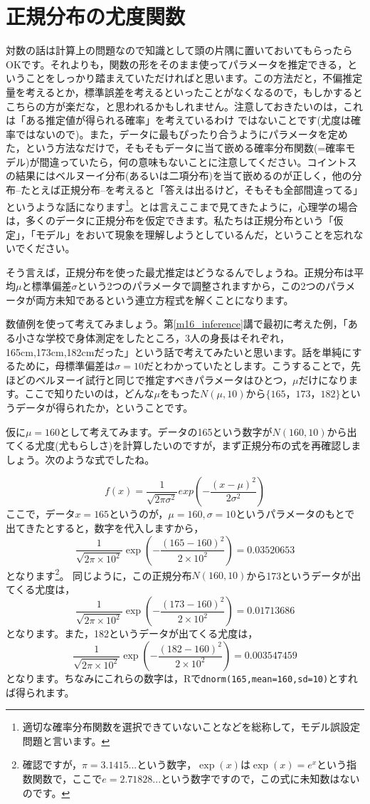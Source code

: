 \documentclass{ltjsbook}
\begin{document}
\section{正規分布の尤度関数}
対数の話は計算上の問題なので知識として頭の片隅に置いておいてもらったらOKです。それよりも，関数の形をそのまま使ってパラメータを推定できる，ということをしっかり踏まえていただければと思います。この方法だと，不偏推定量を考えるとか，標準誤差を考えるといったことがなくなるので，もしかするとこちらの方が楽だな，と思われるかもしれません。注意しておきたいのは，これは「ある推定値が得られる確率」を考えているわけ
ではないことです(尤度は確率ではないので)。また，データに最もぴったり合うようにパラメータを定めた，という方法なだけで，そもそもデータに当て嵌める確率分布関数(=確率モデル)が間違っていたら，何の意味もないことに注意してください。コイントスの結果にはベルヌーイ分布(あるいは二項分布)を当て嵌めるのが正しく，他の分布--たとえば正規分布--を考えると「答えは出るけど，そもそも全部間違ってる」というような話になります\footnote{適切な確率分布関数を選択できていないことなどを総称して，モデル誤設定問題と言います。}。とは言えここまで見てきたように，心理学の場合は，多くのデータに正規分布を仮定できます。私たちは正規分布という「仮定」，「モデル」をおいて現象を理解しようとしているんだ，ということを忘れないでください。

そう言えば，正規分布を使った最尤推定はどうなるんでしょうね。正規分布は平均$\mu$と標準偏差$\sigma$という2つのパラメータで調整されますから，この2つのパラメータが両方未知であるという連立方程式を解くことになります。

数値例を使って考えてみましょう。第\ref{m16_inference}講で最初に考えた例，「ある小さな学校で身体測定をしたところ，3人の身長はそれぞれ，165cm,173cm,182cmだった」という話で考えてみたいと思います。話を単純にするために，母標準偏差は$\sigma=10$だとわかっていたとします。こうすることで，先ほどのベルヌーイ試行と同じで推定すべきパラメータはひとつ，$\mu$だけになります。ここで知りたいのは，どんな$\mu$をもった$N(\mu,10)$から$\{ 165，173，182\}$というデータが得られたか，ということです。

仮に$\mu=160$として考えてみます。データの165という数字が$N(160,10)$から出てくる尤度(尤もらしさ)を計算したいのですが，まず正規分布の式を再確認しましょう。次のような式でしたね。

\[ 	f(x)= \frac{1}{\sqrt{2\pi \sigma^2}} exp\left(-\frac{(x-\mu)^2}{2\sigma^2}\right) \]
ここで，データ$x=165$というのが，$\mu=160,\sigma=10$というパラメータのもとで出てきたとすると，数字を代入しますから，
\[ \frac{1}{\sqrt{2\pi \times 10^2}} \exp\left(-\frac{(165-160)^2}{2\times 10^2}\right) = 0.03520653 \]
となります\footnote{確認ですが，$\pi=3.1415...$という数字，$\exp(x)$は$\exp(x)= e^x$という指数関数で，ここで$e = 2.71828...$という数字ですので，この式に未知数はないのです。}。
同じように，この正規分布$N(160,10)$から173というデータが出てくる尤度は，
\[ \frac{1}{\sqrt{2\pi \times 10^2}} \exp\left(-\frac{(173-160)^2}{2\times 10^2}\right) = 0.01713686 \]
となります。また，182というデータが出てくる尤度は，
\[ \frac{1}{\sqrt{2\pi \times 10^2}} \exp\left(-\frac{(182-160)^2}{2\times 10^2}\right) = 0.003547459 \]
となります。ちなみにこれらの数字は，Rで\texttt{dnorm(165,mean=160,sd=10)}とすれば得られます。
\end{document}
